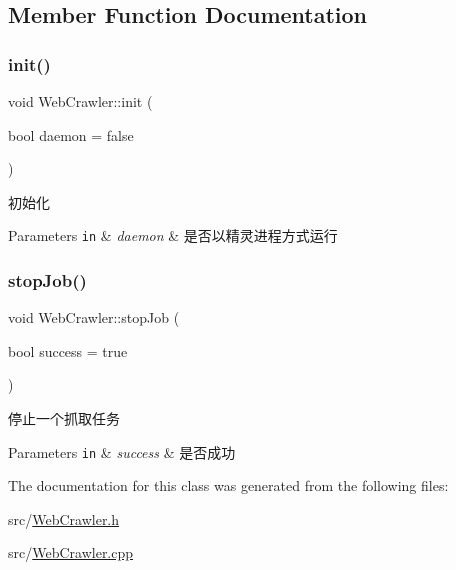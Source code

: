 \subsection{Member Function Documentation}
\mbox{\label{class_web_crawler_aa33817c1f415d3be793e7b43198d253e}} 
\subsubsection{\texorpdfstring{init()}{init()}}
{\footnotesize\ttfamily void Web\+Crawler\+::init (\begin{DoxyParamCaption}\item[{bool}]{daemon = {\ttfamily false} }\end{DoxyParamCaption})}



初始化 


\begin{DoxyParams}[1]{Parameters}
\mbox{\tt in}  & {\em daemon} & 是否以精灵进程方式运行 \\
\hline
\end{DoxyParams}
\mbox{\label{class_web_crawler_a7da15941a0fd20e1ae53d4077d61c9d4}} 
\subsubsection{\texorpdfstring{stop\+Job()}{stopJob()}}
{\footnotesize\ttfamily void Web\+Crawler\+::stop\+Job (\begin{DoxyParamCaption}\item[{bool}]{success = {\ttfamily true} }\end{DoxyParamCaption})}



停止一个抓取任务 


\begin{DoxyParams}[1]{Parameters}
\mbox{\tt in}  & {\em success} & 是否成功 \\
\hline
\end{DoxyParams}


The documentation for this class was generated from the following files\+:\begin{DoxyCompactItemize}
\item 
src/\hyperlink{_web_crawler_8h}{Web\+Crawler.\+h}\item 
src/\hyperlink{_web_crawler_8cpp}{Web\+Crawler.\+cpp}\end{DoxyCompactItemize}
